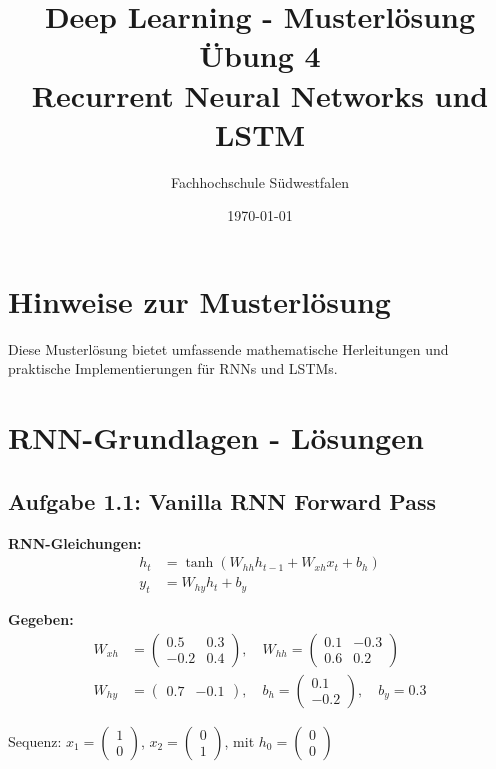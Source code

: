 ﻿\documentclass[12pt,a4paper]{article}
\title{\textbf{Deep Learning - Musterlösung Übung 4} \\ \large Recurrent Neural Networks und LSTM}
\author{Fachhochschule Südwestfalen}
\date{\today}
\begin{document}
\maketitle

\section*{Hinweise zur Musterlösung}
Diese Musterlösung bietet umfassende mathematische Herleitungen und praktische Implementierungen für RNNs und LSTMs.

\section{RNN-Grundlagen - Lösungen}

\subsection{Aufgabe 1.1: Vanilla RNN Forward Pass}

\textbf{RNN-Gleichungen:}
\begin{align}
h_t &= \tanh(W_{hh} h_{t-1} + W_{xh} x_t + b_h) \\
y_t &= W_{hy} h_t + b_y
\end{align}

\textbf{Gegeben:}
\begin{align}
W_{xh} &= \begin{pmatrix} 0.5 & 0.3 \\ -0.2 & 0.4 \end{pmatrix}, \quad 
W_{hh} = \begin{pmatrix} 0.1 & -0.3 \\ 0.6 & 0.2 \end{pmatrix} \\
W_{hy} &= \begin{pmatrix} 0.7 & -0.1 \end{pmatrix}, \quad 
b_h = \begin{pmatrix} 0.1 \\ -0.2 \end{pmatrix}, \quad b_y = 0.3
\end{align}

Sequenz: $x_1 = \begin{pmatrix} 1 \\ 0 \end{pmatrix}$, $x_2 = \begin{pmatrix} 0 \\ 1 \end{pmatrix}$, mit $h_0 = \begin{pmatrix} 0 \\ 0 \end{pmatrix}$
\end{document}
